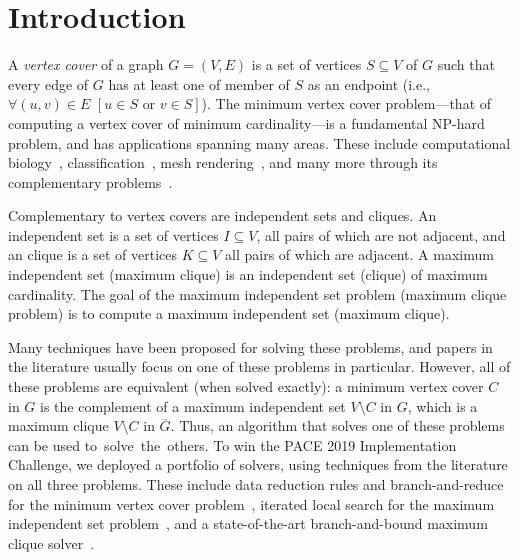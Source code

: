 \documentclass[twoside,leqno,twocolumn]{article}
\begin{document}
\section{Introduction}

A \emph{vertex cover} of a graph $G=(V,E)$ is a set of vertices $S\subseteq V$ of $G$ such that every edge of $G$ has at least one of member of $S$ as an endpoint (i.e., $\forall (u,v) \in E\,\, [u\in S \textrm{ or } v \in S]$).
The minimum vertex cover problem---that of computing a vertex cover of minimum cardinality---is a fundamental NP-hard problem, and has applications spanning many areas. These include computational biology~\cite{cheng2008prediction}, classification~\cite{gottlieb2014efficient}, mesh rendering~\cite{sander2008efficient}, and many more through its complementary problems~\cite{gnntbdmlisaac13,gardiner-docking-2000,harary-clique-1957,zaki-ecommerce-97}.

Complementary to vertex covers are independent sets and cliques. An independent set is a set of vertices $I\subseteq V$, all pairs of which are not adjacent, and an clique is a set of vertices $K\subseteq V$ all pairs of which are adjacent. A maximum independent set (maximum clique) is an independent set (clique) of maximum cardinality. The goal of the maximum independent set problem (maximum clique problem) is to compute a maximum independent set (maximum clique).

Many techniques have been proposed for solving these problems, and papers in the literature usually focus on one of these problems in particular. However, all of these problems are equivalent (when solved exactly): a
minimum vertex cover $C$ in $G$ is the complement of a maximum independent set $V\setminus C$ in $G$, which is a maximum clique $V\setminus C$ in $\overline{G}$. Thus, an algorithm that solves one of these problems can be used to~solve~the~others.
%
To win the PACE 2019 Implementation Challenge, we deployed a portfolio of solvers, using techniques from the literature on all three problems. These include data reduction rules and branch-and-reduce for the minimum vertex cover problem~\cite{akiba-tcs-2016}, iterated local search for the maximum independent set problem~\cite{andrade-2012}, and a state-of-the-art branch-and-bound maximum clique solver~\cite{DBLP:journals/cor/LiJM17}.
\end{document}
